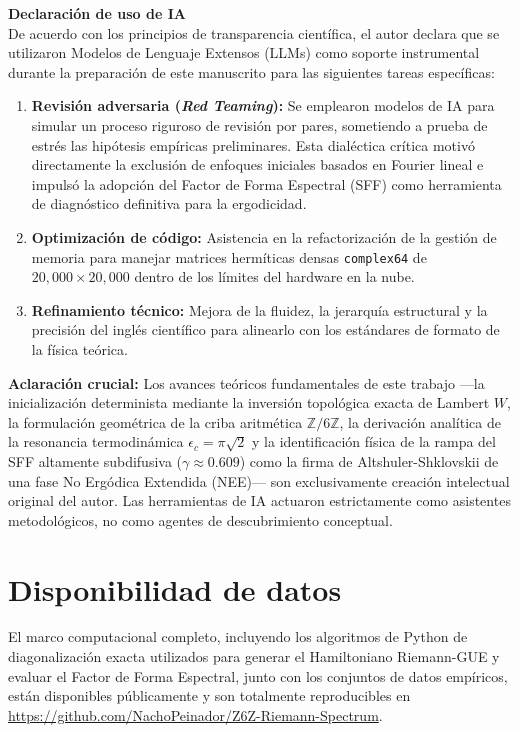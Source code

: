\documentclass[aps,prl,preprint,superscriptaddress,floatfix]{revtex4-2}
\begin{document}
\vspace{0.3cm}
\noindent \textbf{Declaración de uso de IA} \\
De acuerdo con los principios de transparencia científica, el autor declara que se utilizaron Modelos de Lenguaje Extensos (LLMs) como soporte instrumental durante la preparación de este manuscrito para las siguientes tareas específicas:

\begin{enumerate}
    \item \textbf{Revisión adversaria (\textit{Red Teaming}):} Se emplearon modelos de IA para simular un proceso riguroso de revisión por pares, sometiendo a prueba de estrés las hipótesis empíricas preliminares. Esta dialéctica crítica motivó directamente la exclusión de enfoques iniciales basados en Fourier lineal e impulsó la adopción del Factor de Forma Espectral (SFF) como herramienta de diagnóstico definitiva para la ergodicidad.
    \item \textbf{Optimización de código:} Asistencia en la refactorización de la gestión de memoria para manejar matrices hermíticas densas \texttt{complex64} de $20,000 \times 20,000$ dentro de los límites del hardware en la nube.
    \item \textbf{Refinamiento técnico:} Mejora de la fluidez, la jerarquía estructural y la precisión del inglés científico para alinearlo con los estándares de formato de la física teórica.
\end{enumerate}

\textbf{Aclaración crucial:} Los avances teóricos fundamentales de este trabajo —la inicialización determinista mediante la inversión topológica exacta de Lambert $W$, la formulación geométrica de la criba aritmética $\mathbb{Z}/6\mathbb{Z}$, la derivación analítica de la resonancia termodinámica $\epsilon_c = \pi\sqrt{2}$ y la identificación física de la rampa del SFF altamente subdifusiva ($\gamma \approx 0.609$) como la firma de Altshuler-Shklovskii de una fase No Ergódica Extendida (NEE)— son exclusivamente creación intelectual original del autor. Las herramientas de IA actuaron estrictamente como asistentes metodológicos, no como agentes de descubrimiento conceptual.


\section{Disponibilidad de datos}
El marco computacional completo, incluyendo los algoritmos de Python de diagonalización exacta utilizados para generar el Hamiltoniano Riemann-GUE y evaluar el Factor de Forma Espectral, junto con los conjuntos de datos empíricos, están disponibles públicamente y son totalmente reproducibles en \url{https://github.com/NachoPeinador/Z6Z-Riemann-Spectrum}.
\end{document}
